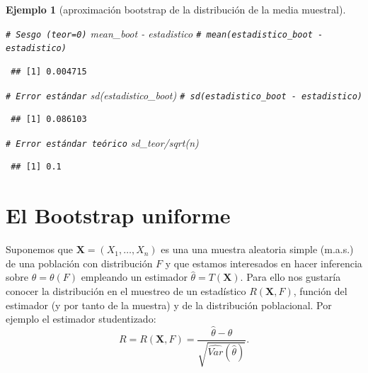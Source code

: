 \documentclass[
  10pt,
]{book}
\newenvironment{Shaded}{\begin{snugshade}}{\end{snugshade}}
\newcommand{\CommentTok}[1]{\textcolor[rgb]{0.56,0.35,0.01}{\textit{#1}}}
\newcommand{\FunctionTok}[1]{\textcolor[rgb]{0.00,0.00,0.00}{#1}}
\newcommand{\NormalTok}[1]{#1}
\newcommand{\SpecialCharTok}[1]{\textcolor[rgb]{0.00,0.00,0.00}{#1}}
\renewcommand{\mathbf}[1]{\symbf{#1}}
\theoremstyle{break}
\newtheorem{example}{Ejemplo}[chapter]
\theoremstyle{nonumberplain}
\renewcommand{\CommentTok}[1]{\textcolor[rgb]{0.41,0.41,0.41}{\texttt{#1}}}
\begin{document}
\begin{example}[aproximación bootstrap de la distribución de la media muestral]
\begin{Shaded}
\begin{Highlighting}[]
\CommentTok{\# Sesgo (teor=0)}
\NormalTok{mean\_boot }\SpecialCharTok{{-}}\NormalTok{ estadistico }\CommentTok{\# mean(estadistico\_boot {-} estadistico)}
\end{Highlighting}
\end{Shaded}

\begin{verbatim}
 ## [1] 0.004715
\end{verbatim}

\begin{Shaded}
\begin{Highlighting}[]
\CommentTok{\# Error estándar}
\FunctionTok{sd}\NormalTok{(estadistico\_boot) }\CommentTok{\# sd(estadistico\_boot {-} estadistico)}
\end{Highlighting}
\end{Shaded}

\begin{verbatim}
 ## [1] 0.086103
\end{verbatim}

\begin{Shaded}
\begin{Highlighting}[]
\CommentTok{\# Error estándar teórico}
\NormalTok{sd\_teor}\SpecialCharTok{/}\FunctionTok{sqrt}\NormalTok{(n) }
\end{Highlighting}
\end{Shaded}

\begin{verbatim}
 ## [1] 0.1
\end{verbatim}

\end{example}

\hypertarget{boot-unif}{%
\section{El Bootstrap uniforme}\label{boot-unif}}

Suponemos que \(\mathbf{X}=\left( X_1,\ldots ,X_n \right)\) es una una muestra aleatoria simple (m.a.s.)
de una población con distribución \(F\) y que estamos interesados en hacer inferencia sobre \(\theta =\theta \left(F \right)\) empleando un estimador \(\hat{\theta} = T\left( \mathbf{X} \right)\).
Para ello nos gustaría conocer la distribución en el muestreo de un estadístico \(R\left( \mathbf{X},F \right)\), función del estimador (y por tanto de la muestra) y de la distribución poblacional.
Por ejemplo el estimador studentizado:
\[R=R\left( \mathbf{X},F \right) = \frac{\hat \theta - \theta}{\sqrt{\widehat{Var}(\hat \theta)}}.\]
\end{document}
